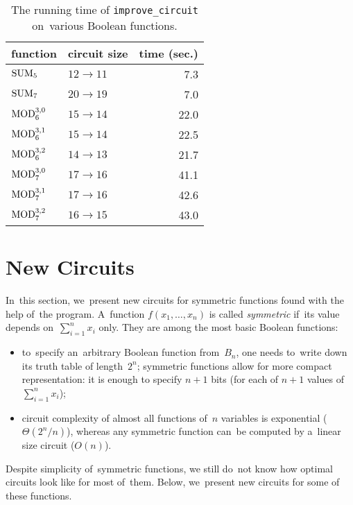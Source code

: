 \begin{table}[ht]
\begin{center}
\begin{tabular}{llr}
\toprule
function & circuit size & time (sec.)\\
\midrule
$\operatorname{SUM}_5$ & $12 \to 11$ & 7.3\\
$\operatorname{SUM}_7$ & $20 \to 19$ & 7.0\\
$\operatorname{MOD}_6^{3,0}$ & $15 \to 14$ & 22.0\\
$\operatorname{MOD}_6^{3,1}$ & $15 \to 14$ & 22.5\\
$\operatorname{MOD}_6^{3,2}$ & $14 \to 13$ & 21.7\\
$\operatorname{MOD}_7^{3,0}$ & $17 \to 16$ & 41.1\\
$\operatorname{MOD}_7^{3,1}$ & $17 \to 16$ & 42.6\\
$\operatorname{MOD}_7^{3,2}$ & $16 \to 15$ & 43.0\\
\bottomrule
\end{tabular}
\end{center}
\caption{The running time of \texttt{improve\_circuit} on~various Boolean functions.} \label{table:improvementrunningtimes}
\end{table}

\section{New Circuits}
In~this section, we~present new circuits for symmetric functions found with the help of~the program. A~function $f(x_1,\dotsc,x_n)$ is called \emph{symmetric} if~its value depends on~$\sum_{i=1}^nx_i$ only. They are among the most basic Boolean functions:
\begin{itemize}
\item to~specify an~arbitrary Boolean function
from~$B_n$, one needs
to~write down its truth table of length~$2^n$; symmetric functions allow for more compact representation: it is enough to specify $n+1$ bits (for each of $n+1$ values
of~$\sum_{i=1}^nx_i$);
\item circuit complexity of almost all functions
of~$n$ variables is exponential ($\Theta(2^n/n)$), whereas any symmetric function can~be computed by a~linear size circuit ($O(n)$).
\end{itemize}
Despite simplicity of~symmetric functions, we still do~not
know how optimal circuits look like for most of~them. Below, we~present new circuits for some of these functions.


